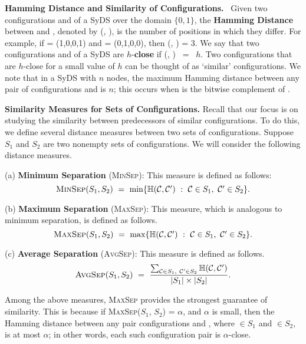 \smallskip

\noindent
\textbf{Hamming Distance and Similarity of Configurations.}~
Given two configurations \calcone{} and \calctwo{} of a SyDS
over the domain $\{0,1\}$,
the \textbf{Hamming Distance} between \calcone{} and \calctwo, 
denoted by \calh(\calcone, \calctwo), is
the number of positions in which they differ.
For example, if
\calcone{} = (1,0,0,1) and \calctwo{} = (0,1,0,0),   
then \calh(\calcone, \calctwo) = 3.  
We say that two configurations \calcone{} and \calctwo{} 
of a SyDS are $h$-\textbf{close} if \calh(\calco, \calct) ~=~ $h$. 
Two configurations that are $h$-close for a small value of $h$
can be thought of as `similar' configurations.  
We note that in a SyDS with $n$ nodes, 
the maximum Hamming distance between any pair of configurations
\calcone{} and \calctwo{} is $n$; this occurs when \calcone{}
is the bitwise complement of \calctwo. 

\smallskip

\noindent
\textbf{Similarity Measures for Sets of Configurations.} Recall
that our focus is on studying the similarity between predecessors
of similar configurations.
To do this, we define several distance measures between two sets of
configurations.
Suppose $S_1$ and $S_2$ are two nonempty sets of configurations.
We will consider the following distance measures.

\newcommand{\minsep}{\mbox{\textsc{MinSep}}}
\newcommand{\maxsep}{\mbox{\textsc{MaxSep}}}
\newcommand{\avgsep}{\mbox{\textsc{AvgSep}}}

\begin{description}
\item{(a)} \textbf{Minimum Separation} (\minsep): This measure is defined as follows:
\[ 
\minsep(S_1, S_2) ~=~ \min\{ \calh(\calc, \calcp) ~:~ 
                                \calc{} \in S_1,~ \calcp{} \in S_2\}.
\]
\item{(b)} \textbf{Maximum Separation} (\maxsep): This measure, which is
analogous to minimum separation, is defined as follows.
\[ 
\maxsep(S_1, S_2) ~=~ \max\{ \calh(\calc, \calcp) ~:~ 
                                \calc{} \in S_1,~ \calcp{} \in S_2\}.
\]
\item{(c)} \textbf{Average Separation} (\avgsep): This measure is defined as follows.
\[ 
\avgsep(S_1, S_2) ~=~ \displaystyle{\frac{\sum_{\mathcal{C} \in S_1,~ \mathcal{C}' \in S_2}
                            \calh(\calc, \calcp)}{|S_1| \times |S_2|}}.
\]
\end{description}
Among the above measures, \maxsep{} provides the 
strongest guarantee of similarity.
This is because if \maxsep($S_1$, $S_2$) = $\alpha$, and $\alpha$ is small,
then the Hamming distance
between any pair configurations \calc{} and \calcp, where \calc{} $\in S_1$
and \calcp{} $\in S_2$, is at most $\alpha$; in other words, 
each such configuration pair is $\alpha$-close.

